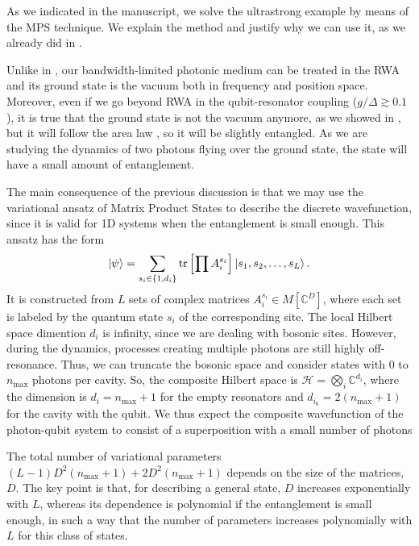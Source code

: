 \documentclass[aps,pra,reprint,amsmath,amssymb]{revtex4-1}
\begin{document}
As we indicated in the manuscript, we solve the ultrastrong example by means of the MPS technique. We explain the method and justify why we can use it, as we already did in \cite{Sanchez-Burillo2014,Sanchez-Burillo2015,Sanchez-Burillo2016a}.

Unlike in \cite{Peropadre2013}, our bandwidth-limited photonic medium can be treated in the RWA and its ground state is the vacuum both in frequency and position space. Moreover, even if we go beyond RWA in the qubit-resonator coupling ($g/\Delta\gtrsim 0.1$), it is true that the ground state is not the vacuum anymore, as we showed in \cite{Sanchez-Burillo2014}, but it will follow the area law \cite{Eisert2010}, so it will be slightly entangled. As we are studying the dynamics of two photons flying over the ground state, the state will have a small amount of entanglement.

The main consequence of the previous discussion is that we may use the variational ansatz of Matrix Product States \cite{Ripoll2006,Verstraete2008} to describe the discrete wavefunction, since it is valid for 1D systems when the entanglement is small enough. This ansatz has the form
\begin{equation}
\ket{\psi} = \sum_{s_i \in \{1,d_i\}} \mathrm{tr}\left[
\prod A_i^{s_i}\right] \ket{s_1,s_2,\ldots,s_L}.
\label{eq:mps}
\end{equation}
It is constructed from $L$ sets of complex matrices $A_i^{s_i} \in M[\mathbb{C}^{D}]$, where each set is labeled by the quantum state $s_i$ of the corresponding site. The local Hilbert space dimention $d_i$ is infinity, since we are dealing with bosonic sites. However, during the dynamics, processes creating multiple photons are still highly off-resonance. Thus, we can truncate the bosonic space and consider states with $0$ to
$n_\text{max}$ photons per cavity. So, the composite Hilbert space is $\mathcal{H}=\bigotimes_i \mathbb{C}^{d_i}$, where the dimension is $d_i=n_\text{max}+1$ for the empty resonators and $d_{i_0}=2(n_\text{max}+1)$ for the cavity with the qubit. We thus expect the composite wavefunction of the photon-qubit system to consist of a superposition with a small number of photons

The total number of variational parameters $(L-1)D^2(n_\text{max}+1) + 2D^2(n_\text{max}+1)$ depends on the size of the matrices, $D$. The key point is that, for describing a general state, $D$ increases exponentially with $L$, whereas its dependence is polynomial if the entanglement is small enough, in such a way that the number of parameters increases polynomially with $L$ for this class of states.
\end{document}
